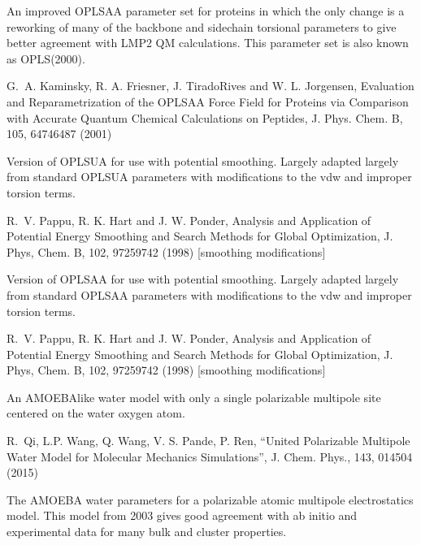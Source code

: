 \documentclass[letterpaper,11pt,english]{sphinxmanual}
\begin{document}
\sphinxAtStartPar
An improved OPLS\sphinxhyphen{}AA parameter set for proteins in which the only change is a reworking of many of the backbone and sidechain torsional parameters to give better agreement with LMP2 QM calculations. This parameter set is also known as OPLS(2000).

\sphinxAtStartPar
G. A. Kaminsky, R. A. Friesner, J. Tirado\sphinxhyphen{}Rives and W. L. Jorgensen, Evaluation and Reparametrization of the OPLS\sphinxhyphen{}AA Force Field for Proteins via Comparison with Accurate Quantum Chemical Calculations on Peptides, J. Phys. Chem. B, 105, 6474\sphinxhyphen{}6487 (2001)

\sphinxAtStartPar
{}

\sphinxAtStartPar
Version of OPLS\sphinxhyphen{}UA for use with potential smoothing. Largely adapted largely from standard OPLS\sphinxhyphen{}UA parameters with modifications to the vdw and improper torsion terms.

\sphinxAtStartPar
R. V. Pappu, R. K. Hart and J. W. Ponder, Analysis and Application of Potential Energy Smoothing and Search Methods for Global Optimization, J. Phys, Chem. B, 102, 9725\sphinxhyphen{}9742 (1998)  {[}smoothing modifications{]}

\sphinxAtStartPar
{}

\sphinxAtStartPar
Version of OPLS\sphinxhyphen{}AA for use with potential smoothing. Largely adapted largely from standard OPLS\sphinxhyphen{}AA parameters with modifications to the vdw and improper torsion terms.

\sphinxAtStartPar
R. V. Pappu, R. K. Hart and J. W. Ponder, Analysis and Application of Potential Energy Smoothing and Search Methods for Global Optimization, J. Phys, Chem. B, 102, 9725\sphinxhyphen{}9742 (1998)  {[}smoothing modifications{]}

\sphinxAtStartPar
{}

\sphinxAtStartPar
An AMOEBA\sphinxhyphen{}like water model with only a single polarizable multipole site centered on the water oxygen atom.

\sphinxAtStartPar
R. Qi, L.\sphinxhyphen{}P. Wang, Q. Wang, V. S. Pande, P. Ren, “United Polarizable Multipole Water Model for Molecular Mechanics Simulations”, J. Chem. Phys., 143, 014504 (2015)

\sphinxAtStartPar
{}

\sphinxAtStartPar
The AMOEBA water parameters for a polarizable atomic multipole electrostatics model. This model from 2003 gives good agreement with ab initio and experimental data for many bulk and cluster properties.
\end{document}
